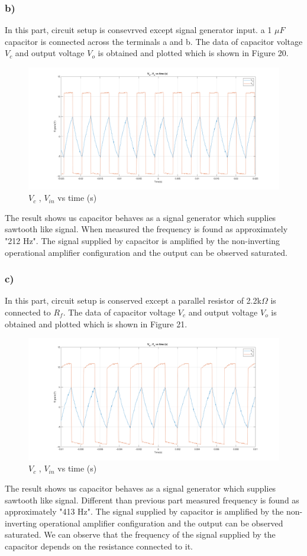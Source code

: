 \documentclass[letterpaper,12pt]{article}
\begin{document}
\subsubsection{b)}
In this part, circuit setup is consevrved except signal generator input. a 1 \(\mu F\) capacitor is connected across the terminals a and b.  
The data of capacitor voltage \(V_c\) and output voltage \(V_o\) is obtained and plotted which is shown in Figure 20. 
\begin{figure}[H]
	\centering
   \includegraphics[width=1\textwidth]{3b_1_new.png}
   \caption{\(V_{c}\) , \(V_{in}\) vs time (s) }
\end{figure}
The result shows us capacitor behaves as a signal generator which supplies sawtooth like signal. When measured the frequency is found as approximately "212 Hz". The signal supplied by capacitor is amplified by the non-inverting operational amplifier configuration and the output can be observed saturated. 
\subsubsection{c)}

In this part, circuit setup is conserved except a parallel resistor of 2.2k\(\Omega\) is connected to \(R_f\). 
The data of capacitor voltage \(V_c\) and output voltage \(V_o\) is obtained and plotted which is shown in Figure 21. 
\begin{figure}[H]
	\centering
   \includegraphics[width=1\textwidth]{3c_1_new.png}
   \caption{\(V_{c}\) , \(V_{in}\) vs time (s) }
\end{figure}
The result shows us capacitor behaves as a signal generator which supplies sawtooth like signal. Different than previous part measured frequency is found as approximately "413 Hz". The signal supplied by capacitor is amplified by the non-inverting operational amplifier configuration and the output can be observed saturated. We can observe that the frequency of the signal supplied by the capacitor depends on the resistance connected to it. 
\end{document}
